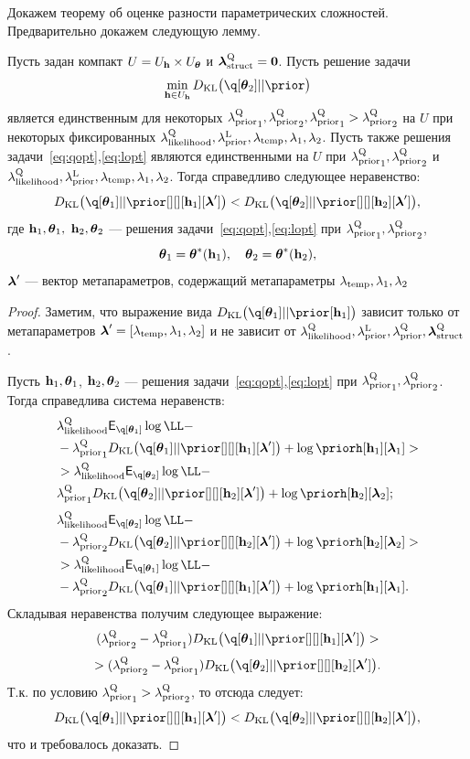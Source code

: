 Докажем теорему об оценке разности параметрических сложностей. Предварительно докажем следующую лемму.
\begin{lemma}
\label{lem:cp}
Пусть задан компакт $U = U_{\mathbf{h}} \times U_{\boldsymbol{\theta}}$ и  $\boldsymbol{\lambda}_\text{struct}^\text{Q}=\mathbf{0}$. Пусть решение задачи
\begin{equation}
\label{eq:cp_theorem_kl}
\min_{\h \in \Uh} \KL{\q[\teta_2]}{\prior}
\end{equation}
 является единственным для некоторых ${\lambda_\text{prior}^\text{Q}}_1, {\lambda_\text{prior}^\text{Q}}_2, {\lambda_\text{prior}^\text{Q}}_1 > {\lambda_\text{prior}^\text{Q}}_2$ на $U$ при некоторых фиксированных $\lambda_\text{likelihood}^\text{Q}, \lambda_\text{prior}^\text{L}, \lambda_{\text{temp}}, \lambda_1, \lambda_2$.
Пусть также решения задачи~\eqref{eq:qopt},\eqref{eq:lopt} являются единственными на $U$ при ${\lambda_\text{prior}^\text{Q}}_1, {\lambda_\text{prior}^\text{Q}}_2$ и $\lambda_\text{likelihood}^\text{Q}, \lambda_\text{prior}^\text{L}, \lambda_{\text{temp}}, \lambda_1, \lambda_2$.
Тогда справедливо следующее неравенство:
\[
    \KL{\q[\teta_1]}{\prior[][][\h_1][\lam']}  <   \KL{\q[\teta_2]}{\prior[][][\h_2][\lam']},
\]
где $\mathbf{h}_1, \boldsymbol{\theta}_1,$ $\mathbf{h}_2, \boldsymbol{\theta}_2$  --- решения задачи~\eqref{eq:qopt},\eqref{eq:lopt} при ${\lambda_\text{prior}^\text{Q}}_1, {\lambda_\text{prior}^\text{Q}}_2$,
$$
\boldsymbol{\theta}_1 = \boldsymbol{\theta}^{*}(\mathbf{h}_1), \quad  \boldsymbol{\theta}_2 = \boldsymbol{\theta}^{*}(\mathbf{h}_2),
$$
$\boldsymbol{\lambda}'$ --- вектор метапараметров, содержащий метапараметры $\lambda_{\text{temp}}, \lambda_1, \lambda_2$

\end{lemma}
\begin{proof}
Заметим, что выражение вида $\KL{\q[\teta_1]}{\prior[\h_1]}$ зависит только от метапараметров  $\boldsymbol{\lambda}' = [\lambda_{\text{temp}}, \lambda_1, \lambda_2]$ и не зависит от $\lambda_\text{likelihood}^\text{Q}, \lambda_\text{prior}^\text{L}, \lambda_\text{prior}^\text{Q}, \boldsymbol{\lambda}_\text{struct}^\text{Q}$.  

Пусть $\mathbf{h}_1, \boldsymbol{\theta}_1$, $\mathbf{h}_2, \boldsymbol{\theta}_2$  --- решения задачи~\eqref{eq:qopt},\eqref{eq:lopt} при ${\lambda_\text{prior}^\text{Q}}_1, {\lambda_\text{prior}^\text{Q}}_2$.
Тогда справедлива система неравенств:
\begin{align*}
&\lamLL \E_{\q[\teta_1]}\log \LL - \\
&-{\lamCQ}_1\KL{\q[\teta_1]}{\prior[][][\h_1][\lam']} + \log\priorh[\h_1][\lam_1]> \\
&> \lamLL \E_{\q[\teta_2]}\log \LL - \\
&{\lamCQ}_1\KL{\q[\teta_2]}{\prior[][][\h_2][\lam']} + \log\priorh[\h_2][\lam_2];
\end{align*}
\begin{align*}
&\lamLL \E_{\q[\teta_2]}\log \LL - \\
&-{\lamCQ}_2\KL{\q[\teta_2]}{\prior[][][\h_2][\lam']} + \log\priorh[\h_2][\lam_2] >\\
&> \lamLL \E_{\q[\teta_1]}\log \LL -\\
&- {\lamCQ}_2\KL{\q[\teta_1]}{\prior[][][\h_1][\lam']} + \log\priorh[\h_1][\lam_1].
\end{align*}
Складывая неравенства получим следующее выражение:
\[
   ({\lamCQ}_2 - {\lamCQ}_1 )\KL{\q[\teta_1]}{\prior[][][\h_1][\lam']}  >
\]
\[
>    ({\lamCQ}_2 - {\lamCQ}_1 )\KL{\q[\teta_2]}{\prior[][][\h_2][\lam']}. 
\]
Т.к. по условию ${\lambda_\text{prior}^\text{Q}}_1 > {\lambda_\text{prior}^\text{Q}}_2$, то отсюда следует:
\[
    \KL{\q[\teta_1]}{\prior[][][\h_1][\lam']}  <   \KL{\q[\teta_2]}{\prior[][][\h_2][\lam']},
\]
что и требовалось доказать.
\end{proof}

